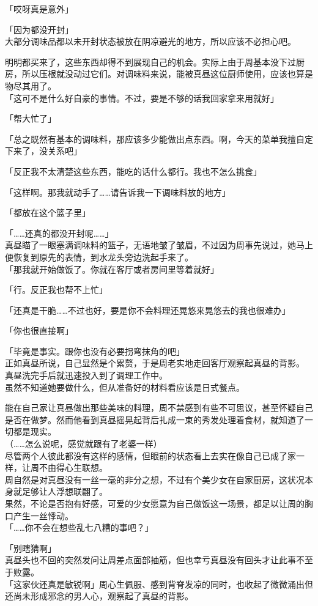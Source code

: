 「哎呀真是意外」

「因为都没开封」\\

大部分调味品都以未开封状态被放在阴凉避光的地方，所以应该不必担心吧。

明明都买来了，这些东西却得不到展现自己的机会。实际上由于周基本没下过厨房，所以压根就没动过它们。对调味料来说，能被真昼这位厨师使用，应该也算是物尽其用了。\\

「这可不是什么好自豪的事情。不过，要是不够的话我回家拿来用就好」

「帮大忙了」

「总之既然有基本的调味料，那应该多少能做出点东西。啊，今天的菜单我擅自定下来了，没关系吧」

「反正我不太清楚这些东西，能吃的话什么都行。我也不怎么挑食」

「这样啊。那我就动手了……请告诉我一下调味料放的地方」

「都放在这个篮子里」

「……还真的都没开封呢……」\\

真昼瞄了一眼塞满调味料的篮子，无语地皱了皱眉，不过因为周事先说过，她马上便恢复到原先的表情，到水龙头旁边洗起手来了。\\

「那我就开始做饭了。你就在客厅或者房间里等着就好」

「行。反正我也帮不上忙」

「还真是干脆……不过也好，要是你不会料理还晃悠来晃悠去的我也很难办」

「你也很直接啊」

「毕竟是事实。跟你也没有必要拐弯抹角的吧」\\

正如真昼所说，自己显然是个累赘，于是周老实地走回客厅观察起真昼的背影。\\

真昼洗完手后就迅速投入到了调理工作中。\\

虽然不知道她要做什么，但从准备好的材料看应该是日式餐点。

能在自己家让真昼做出那些美味的料理，周不禁感到有些不可思议，甚至怀疑自己是否在做梦。然而他看到真昼摇晃起背后扎成一束的秀发处理着食材，就知道了一切都是现实。\\

（……怎么说呢，感觉就跟有了老婆一样）\\

尽管两个人彼此都没有这样的感情，但眼前的状态看上去实在像自己已成了家一样，让周不由得心生联想。\\

周自然是对真昼没有一丝一毫的非分之想，不过有个美少女在自家厨房，这状况本身就足够让人浮想联翩了。\\

果然，不论是否抱有好感，可爱的少女愿意为自己做饭这一场景，都足以让周的胸口产生一丝悸动。\\

「……你不会在想些乱七八糟的事吧？」

「别瞎猜啊」\\

真昼头也不回的突然发问让周差点面部抽筋，但也幸亏真昼没有回头才让此事不至于败露。\\

「这家伙还真是敏锐啊」周心生佩服、感到背脊发凉的同时，也收起了微微涌出但还尚未形成邪念的男人心，观察起了真昼的背影。
